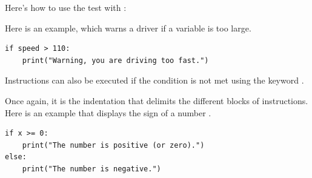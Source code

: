 \documentclass[11pt,class=report,crop=false]{standalone}
\begin{document}




\begin{cours}[If ... then ...]

Here's how to use the test \og{}\fg{} with \Python{}:


Here is an example, which warns a driver if a variable  is too large.
\begin{center}
\begin{minipage}{0.7\textwidth}
\begin{lstlisting}
if speed > 110:
    print("Warning, you are driving too fast.")
\end{lstlisting}
\end{minipage} 
\end{center} 

Instructions can also be executed if the condition is not met using the keyword \og{}\fg{}.


Once again, it is the indentation that delimits the different blocks of instructions.
Here is an example that displays the sign of a number .
\begin{center}
\begin{minipage}{0.5\textwidth}
\begin{lstlisting}
if x >= 0:
    print("The number is positive (or zero).")
else:
    print("The number is negative.")
\end{lstlisting}
\end{minipage} 
\end{center} 


\end{cours}


\end{document}
